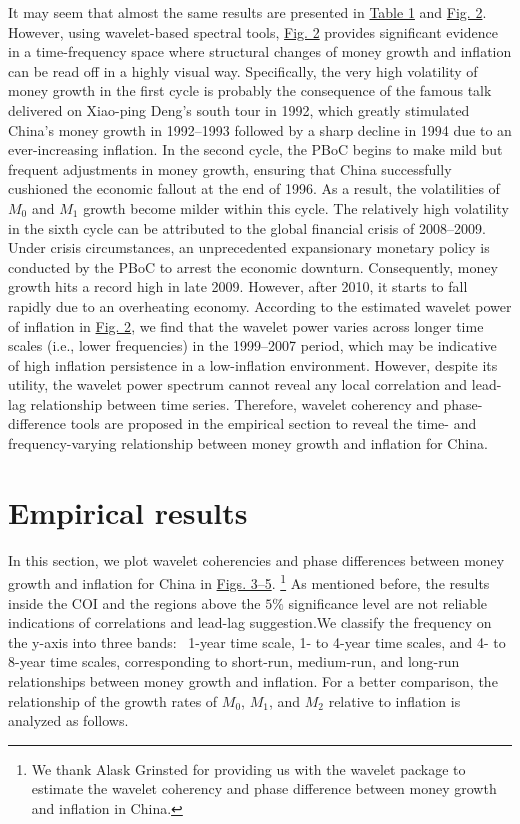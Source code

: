 \documentclass[a4paper,fleqn]{cas-sc}
\begin{document}
It may seem that almost the same results are presented in \hyperref[tbl1]{Table 1} and \hyperref[fig:2]{Fig. 2}. However, using wavelet-based spectral tools, \hyperref[fig:2]{Fig. 2} provides significant evidence in a time-frequency space where structural changes of money growth and inflation can be read off in a highly visual way. Specifically, the very high volatility of money growth in the first cycle is probably the consequence of the famous talk delivered on Xiao-ping Deng's south tour in 1992, which greatly stimulated China's money growth in 1992–1993 followed by a sharp decline in 1994 due to an ever-increasing inflation. In the second cycle, the PBoC begins to make mild but frequent adjustments in money growth, ensuring that China successfully cushioned the economic fallout at the end of 1996. As a result, the volatilities of $M_0$ and $M_1$ growth become milder within this cycle. The relatively high volatility in the sixth cycle can be attributed to the global financial crisis of 2008–2009. Under crisis circumstances, an unprecedented expansionary monetary policy is conducted by the PBoC to arrest the economic downturn. Consequently, money growth hits a record high in late 2009. However, after 2010, it starts to fall rapidly due to an overheating economy. According to the estimated wavelet power of inflation in \hyperref[fig:2]{Fig. 2}, we find that the wavelet power varies across longer time scales (i.e., lower frequencies) in the 1999–2007 period, which may be indicative of high inflation persistence in a low-inflation environment. However, despite its utility, the wavelet power spectrum cannot reveal any local correlation and lead-lag relationship between time series. Therefore, wavelet coherency and phase-difference tools are proposed in the empirical section to reveal the time- and frequency-varying relationship between money growth and inflation for China.

\section{Empirical results}\label{sec:5}
In this section, we plot wavelet coherencies and phase differences between money growth and inflation for China in \hyperref[fig:3]{Figs. 3–5}.
\footnote{We thank Alask Grinsted for providing us with the wavelet package to estimate the wavelet coherency and phase difference between money growth and inflation in China.}
    As mentioned before, the results inside the COI and the regions above the $5\%$ significance level are not reliable indications of correlations and lead-lag suggestion.We classify the frequency on the y-axis into three bands: ~1-year time scale, 1- to 4-year time scales, and 4- to 8-year time scales, corresponding to short-run, medium-run, and long-run relationships between money growth and inflation. For a better comparison, the relationship of the growth rates of $M_0$, $M_1$, and $M_2$ relative to inflation is analyzed as follows.
\end{document}

